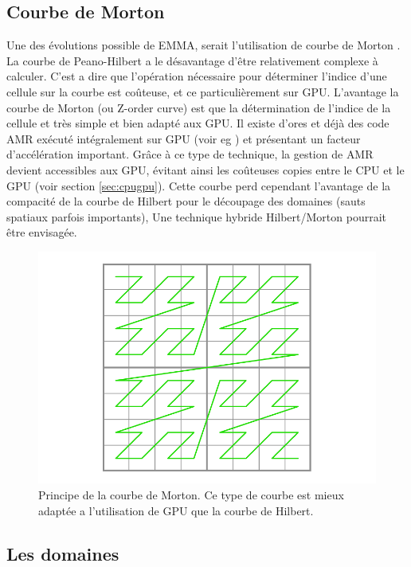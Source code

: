 \subsection{Courbe de Morton}

Une des évolutions possible de EMMA, serait l'utilisation de courbe de Morton \citep{morton1966computer}.
La courbe de Peano-Hilbert a le désavantage d'être relativement complexe à calculer.
C'est a dire que l'opération nécessaire pour déterminer l'indice d'une cellule sur la courbe est coûteuse, et ce particulièrement sur \ac{GPU}.
L'avantage la courbe de Morton (ou Z-order curve) est que la détermination de l'indice de la cellule et très simple et bien adapté aux \ac{GPU}.
Il existe d'ores et déjà des code \ac{AMR} exécuté intégralement sur \ac{GPU} (voir eg \cite{2012ASPC..453..325B}) et présentant un facteur d'accélération important.
Grâce à ce type de technique, la gestion de \ac{AMR} devient accessibles aux \ac{GPU}, évitant ainsi les coûteuses copies entre le \ac{CPU} et le \ac{GPU} (voir section \ref{sec:cpugpu}).
Cette courbe perd cependant l'avantage de la compacité de la courbe de Hilbert pour le découpage des domaines (sauts spatiaux parfois importants),
Une technique hybride Hilbert/Morton pourrait être envisagée.

\begin{figure}
        \includegraphics[width=.95\linewidth]{img/02/ZCurve.png} 
        \caption[Courbe de Morton]{Principe de la courbe de Morton.
        Ce type de courbe est mieux adaptée a l'utilisation de \ac{GPU} que la courbe de Hilbert.
 		\label{fig:hilbert}}
\end{figure}


\subsection{Les domaines}

